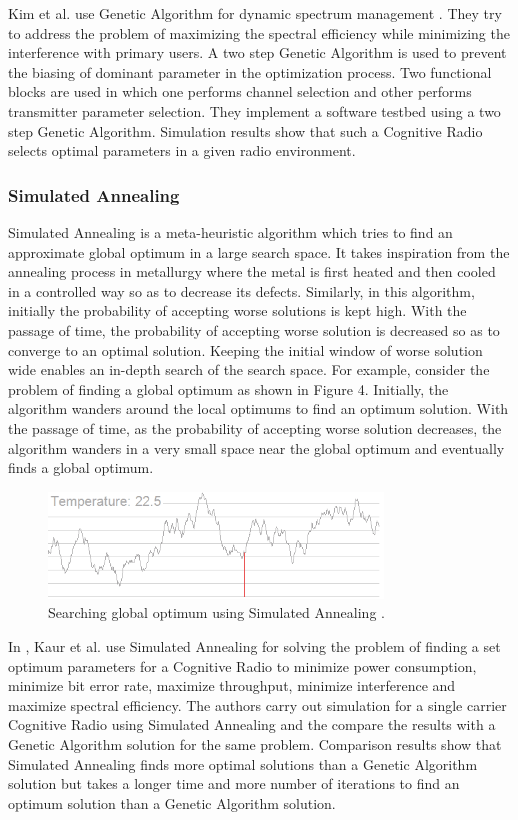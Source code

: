 \documentclass[conference]{IEEEtran}
\begin{document}
    Kim et al. use Genetic Algorithm for dynamic spectrum management \cite{10}. They try to address the problem of maximizing the spectral efficiency while minimizing the interference with primary users. A two step Genetic Algorithm is used to prevent the biasing of dominant parameter in the optimization process. Two functional blocks are used in which one performs channel selection and other performs transmitter parameter selection. They implement a software testbed using a two step Genetic Algorithm. Simulation results show that such a Cognitive Radio selects optimal parameters in a given radio environment. 
    
	
\subsubsection{Simulated Annealing}
	Simulated Annealing is a meta-heuristic algorithm which tries to find an approximate global optimum in a large search space. It takes inspiration from the annealing process in metallurgy where the metal is first heated and then cooled in a controlled way so as to decrease its defects. Similarly, in this algorithm, initially the probability of accepting worse solutions is kept high. With the passage of time, the probability of accepting worse solution is decreased so as to converge to an optimal solution. Keeping the initial window of worse solution wide enables an in-depth search of the search space. For example, consider the problem of finding a global optimum as shown in Figure 4. Initially, the algorithm wanders around the local optimums to find an optimum solution. With the passage of time, as the probability of accepting worse solution decreases, the algorithm wanders in a very small space near the global optimum and eventually finds a global optimum. 

\begin{figure}[!t]
\centering
\includegraphics[width=3.5in]{Figure_4}
\caption{Searching global optimum using Simulated Annealing \cite{23}.}
\label{fig_sa}
\end{figure}

In \cite{11}, Kaur et al. use Simulated Annealing for solving the problem of finding a set optimum parameters for a Cognitive Radio to minimize power consumption, minimize bit error rate, maximize throughput, minimize interference and maximize spectral efficiency. The authors carry out simulation for a single carrier Cognitive Radio using Simulated Annealing and the compare the results with a Genetic Algorithm solution for the same problem. Comparison results show that Simulated Annealing finds more optimal solutions than a Genetic Algorithm solution but takes a longer time and more number of iterations to find an optimum solution than a Genetic Algorithm solution.
\end{document}
